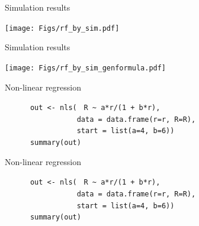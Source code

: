 \documentclass[12pt]{article}
\newcommand{\headsize}{\fontsize{35}{35} \selectfont}
\newcommand{\textsize}{\fontsize{30}{35} \selectfont}
\begin{document}
\headsize \color{myyellow}
\hfill \begin{minipage}{5.75in}
\centering
Simulation results
\end{minipage}

\vfill

\centerline{\texttt{[image: Figs/rf\_by\_sim.pdf]}}

\vspace{15mm}

\newpage

\headsize \color{myyellow}
\hfill \begin{minipage}{5.75in}
\centering
Simulation results
\end{minipage}

\vfill

\centerline{\texttt{[image: Figs/rf\_by\_sim\_genformula.pdf]}}

\vspace{15mm}

\newpage

\headsize \color{myyellow}
\hfill \begin{minipage}{5.75in}
\centering
Non-linear regression
\end{minipage}


\vspace{30mm}

\textsize 
{\color{myblue}
\verb|      out <- nls(| {\tt \color{mypink} R \verb|~| a*r/(1 + b*r)}\verb|,| \\
\verb|                 data = data.frame(r=r, R=R),| \\
\verb|                 start = list(a=4, b=6))| \\
\verb|      summary(out)|
}

\newpage
\addtocounter{page}{-1}

\headsize \color{myyellow}
\hfill \begin{minipage}{5.75in}
\centering
Non-linear regression
\end{minipage}


\vspace{30mm}

\textsize 
{\color{myblue}
\verb|      out <- nls(| {\tt \color{mypink} R \verb|~| a*r/(1 + b*r)}\verb|,| \\
\verb|                 data = data.frame(r=r, R=R),| \\
\verb|                 start = list(a=4, b=6))| \\
\verb|      summary(out)|
}

\vspace{15mm}
\end{document}

